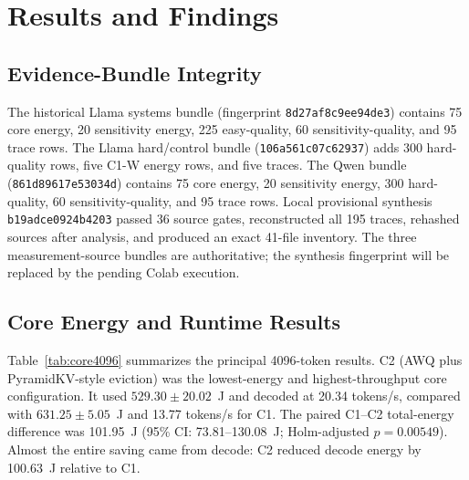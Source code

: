 \documentclass[conference]{IEEEtran}
\begin{document}
\section{Results and Findings}

\subsection{Evidence-Bundle Integrity}

The historical Llama systems bundle (fingerprint \texttt{8d27af8c9ee94de3}) contains 75 core energy, 20 sensitivity energy, 225 easy-quality, 60 sensitivity-quality, and 95 trace rows. The Llama hard/control bundle (\texttt{106a561c07c62937}) adds 300 hard-quality rows, five C1-W energy rows, and five traces. The Qwen bundle (\texttt{861d89617e53034d}) contains 75 core energy, 20 sensitivity energy, 300 hard-quality, 60 sensitivity-quality, and 95 trace rows. Local provisional synthesis \texttt{b19adce0924b4203} passed 36 source gates, reconstructed all 195 traces, rehashed sources after analysis, and produced an exact 41-file inventory. The three measurement-source bundles are authoritative; the synthesis fingerprint will be replaced by the pending Colab execution.

\subsection{Core Energy and Runtime Results}

Table~\ref{tab:core4096} summarizes the principal 4096-token results. C2 (AWQ plus PyramidKV-style eviction) was the lowest-energy and highest-throughput core configuration. It used $529.30\pm20.02$~J and decoded at 20.34 tokens/s, compared with $631.25\pm5.05$~J and 13.77 tokens/s for C1. The paired C1--C2 total-energy difference was 101.95~J (95\% CI: 73.81--130.08~J; Holm-adjusted $p=0.00549$). Almost the entire saving came from decode: C2 reduced decode energy by 100.63~J relative to C1.

\begin{table}[htbp]
\caption{Core Results at 4096 Tokens (Mean $\pm$ SD, $n=5$; Cache is Post-Decode)}
\label{tab:core4096}
\centering\small
{}
\end{table}
\end{document}
